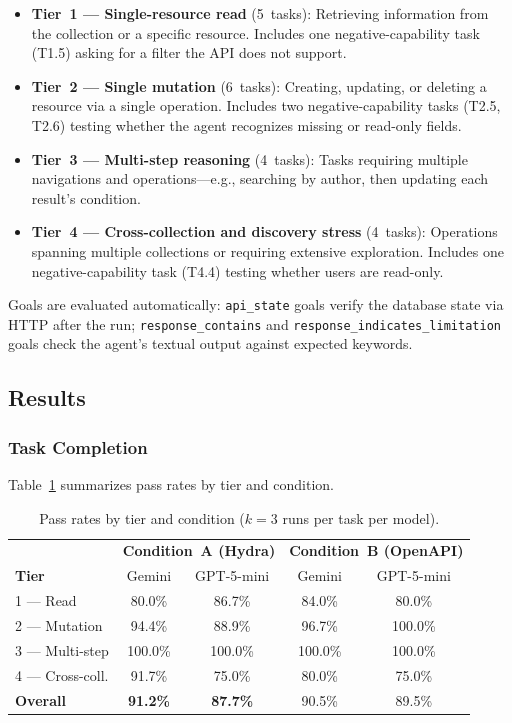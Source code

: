 \documentclass[11pt,a4paper]{article}
\begin{document}
\begin{itemize}
  \item \textbf{Tier~1 --- Single-resource read} (5~tasks): Retrieving information from the collection or a specific resource. Includes one negative-capability task (T1.5) asking for a filter the API does not support.
  \item \textbf{Tier~2 --- Single mutation} (6~tasks): Creating, updating, or deleting a resource via a single operation. Includes two negative-capability tasks (T2.5, T2.6) testing whether the agent recognizes missing or read-only fields.
  \item \textbf{Tier~3 --- Multi-step reasoning} (4~tasks): Tasks requiring multiple navigations and operations---e.g., searching by author, then updating each result's condition.
  \item \textbf{Tier~4 --- Cross-collection and discovery stress} (4~tasks): Operations spanning multiple collections or requiring extensive exploration. Includes one negative-capability task (T4.4) testing whether users are read-only.
\end{itemize}

Goals are evaluated automatically: \texttt{api\_state} goals verify the database state via HTTP after the run; \texttt{response\_contains} and \texttt{response\_indicates\_limitation} goals check the agent's textual output against expected keywords.

\subsection{Results}

\subsubsection{Task Completion}

Table~\ref{tab:completion} summarizes pass rates by tier and condition.

\begin{table}[H]
\centering
\small
\begin{tabular}{l|cc|cc}
\hline
 & \multicolumn{2}{c|}{\textbf{Condition~A (Hydra)}} & \multicolumn{2}{c}{\textbf{Condition~B (OpenAPI)}} \\
\textbf{Tier} & Gemini & GPT-5-mini & Gemini & GPT-5-mini \\
\hline
1 --- Read         & 80.0\% & 86.7\% & 84.0\% & 80.0\% \\
2 --- Mutation     & 94.4\% & 88.9\% & 96.7\% & 100.0\% \\
3 --- Multi-step   & 100.0\% & 100.0\% & 100.0\% & 100.0\% \\
4 --- Cross-coll.  & 91.7\% & 75.0\% & 80.0\% & 75.0\% \\
\hline
\textbf{Overall}   & \textbf{91.2\%} & \textbf{87.7\%} & 90.5\% & 89.5\% \\
\hline
\end{tabular}
\caption{Pass rates by tier and condition ($k=3$ runs per task per model).}
\label{tab:completion}
\end{table}
\end{document}
